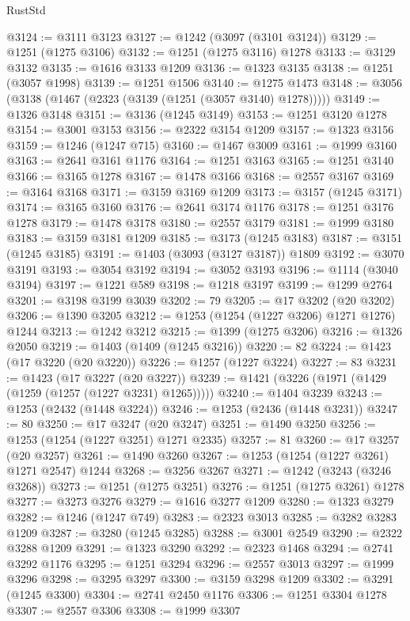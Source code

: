 \begin{lexlean}{RustStd}
\begin{coremodule}
@3124 := @3111 @3123
@3127 := @1242 (@3097 (@3101 @3124))
@3129 := @1251 (@1275 @3106)
@3132 := @1251 (@1275 @3116) @1278
@3133 := @3129 @3132
@3135 := @1616 @3133 @1209
@3136 := @1323 @3135
@3138 := @1251 (@3057 @1998)
@3139 := @1251 @1506
@3140 := @1275 @1473
@3148 := @3056 (@3138 (@1467 (@2323 (@3139 (@1251 (@3057 @3140) @1278)))))
@3149 := @1326 @3148
@3151 := @3136 (@1245 @3149)
@3153 := @1251 @3120 @1278
@3154 := @3001 @3153
@3156 := @2322 @3154 @1209
@3157 := @1323 @3156
@3159 := @1246 (@1247 @715)
@3160 := @1467 @3009
@3161 := @1999 @3160
@3163 := @2641 @3161 @1176
@3164 := @1251 @3163
@3165 := @1251 @3140
@3166 := @3165 @1278
@3167 := @1478 @3166
@3168 := @2557 @3167
@3169 := @3164 @3168
@3171 := @3159 @3169 @1209
@3173 := @3157 (@1245 @3171)
@3174 := @3165 @3160
@3176 := @2641 @3174 @1176
@3178 := @1251 @3176 @1278
@3179 := @1478 @3178
@3180 := @2557 @3179
@3181 := @1999 @3180
@3183 := @3159 @3181 @1209
@3185 := @3173 (@1245 @3183)
@3187 := @3151 (@1245 @3185)
@3191 := @1403 (@3093 (@3127 @3187)) @1809
@3192 := @3070 @3191
@3193 := @3054 @3192
@3194 := @3052 @3193
@3196 := @1114 (@3040 @3194)
@3197 := @1221 @589
@3198 := @1218 @3197
@3199 := @1299 @2764
@3201 := @3198 @3199 @3039
@3202 := 79
@3205 := @17 @3202 (@20 @3202)
@3206 := @1390 @3205
@3212 := @1253 (@1254 (@1227 @3206) @1271 @1276) @1244
@3213 := @1242 @3212
@3215 := @1399 (@1275 @3206)
@3216 := @1326 @2050
@3219 := @1403 (@1409 (@1245 @3216))
@3220 := 82
@3224 := @1423 (@17 @3220 (@20 @3220))
@3226 := @1257 (@1227 @3224)
@3227 := 83
@3231 := @1423 (@17 @3227 (@20 @3227))
@3239 := @1421 (@3226 (@1971 (@1429 (@1259 (@1257 (@1227 @3231) @1265)))))
@3240 := @1404 @3239
@3243 := @1253 (@2432 (@1448 @3224))
@3246 := @1253 (@2436 (@1448 @3231))
@3247 := 80
@3250 := @17 @3247 (@20 @3247)
@3251 := @1490 @3250
@3256 := @1253 (@1254 (@1227 @3251) @1271 @2335)
@3257 := 81
@3260 := @17 @3257 (@20 @3257)
@3261 := @1490 @3260
@3267 := @1253 (@1254 (@1227 @3261) @1271 @2547) @1244
@3268 := @3256 @3267
@3271 := @1242 (@3243 (@3246 @3268))
@3273 := @1251 (@1275 @3251)
@3276 := @1251 (@1275 @3261) @1278
@3277 := @3273 @3276
@3279 := @1616 @3277 @1209
@3280 := @1323 @3279
@3282 := @1246 (@1247 @749)
@3283 := @2323 @3013
@3285 := @3282 @3283 @1209
@3287 := @3280 (@1245 @3285)
@3288 := @3001 @2549
@3290 := @2322 @3288 @1209
@3291 := @1323 @3290
@3292 := @2323 @1468
@3294 := @2741 @3292 @1176
@3295 := @1251 @3294
@3296 := @2557 @3013
@3297 := @1999 @3296
@3298 := @3295 @3297
@3300 := @3159 @3298 @1209
@3302 := @3291 (@1245 @3300)
@3304 := @2741 @2450 @1176
@3306 := @1251 @3304 @1278
@3307 := @2557 @3306
@3308 := @1999 @3307

\end{coremodule}
\end{lexlean}
